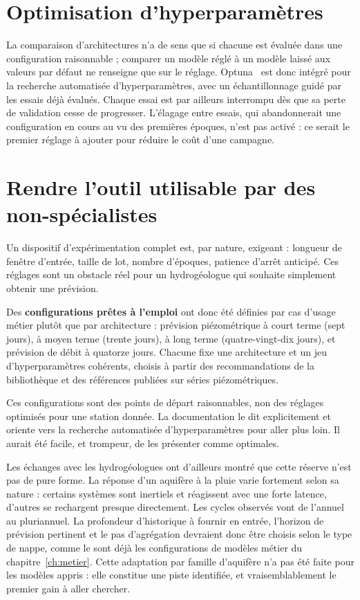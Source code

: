 \section{Optimisation d'hyperparamètres}

La comparaison d'architectures n'a de sens que si chacune est évaluée dans une configuration
raisonnable ; comparer un modèle réglé à un modèle laissé aux valeurs par défaut ne renseigne
que sur le réglage. Optuna~\cite{optuna} est donc intégré pour la recherche automatisée d'hyperparamètres, avec un
échantillonnage guidé par les essais déjà évalués. Chaque essai est par ailleurs interrompu dès
que sa perte de validation cesse de progresser. L'élagage entre essais, qui abandonnerait une
configuration en cours au vu des premières époques, n'est pas activé : ce serait le premier
réglage à ajouter pour réduire le coût d'une campagne.

\section{Rendre l'outil utilisable par des non-spécialistes}

Un dispositif d'expérimentation complet est, par nature, exigeant : longueur de fenêtre
d'entrée, taille de lot, nombre d'époques, patience d'arrêt anticipé. Ces réglages sont un
obstacle réel pour un hydrogéologue qui souhaite simplement obtenir une prévision.

Des \textbf{configurations prêtes à l'emploi} ont donc été définies par cas d'usage métier
plutôt que par architecture : prévision piézométrique à court terme (sept jours), à moyen terme
(trente jours), à long terme (quatre-vingt-dix jours), et prévision de débit à quatorze jours.
Chacune fixe une architecture et un jeu d'hyperparamètres cohérents, choisis à partir des
recommandations de la bibliothèque et des références publiées sur séries piézométriques.

Ces configurations sont des points de départ raisonnables, non des réglages optimisés pour une
station donnée. La documentation le dit explicitement et oriente vers la recherche automatisée
d'hyperparamètres pour aller plus loin. Il aurait été facile, et trompeur, de les présenter
comme optimales.

Les échanges avec les hydrogéologues ont d'ailleurs montré que cette réserve n'est pas de pure
forme. La réponse d'un aquifère à la pluie varie fortement selon sa nature : certains systèmes
sont inertiels et réagissent avec une forte latence, d'autres se rechargent presque
directement. Les cycles observés vont de l'annuel au pluriannuel. La profondeur d'historique à
fournir en entrée, l'horizon de prévision pertinent et le pas d'agrégation devraient donc être
choisis selon le type de nappe, comme le sont déjà les configurations de modèles métier du
chapitre~\ref{ch:metier}. Cette adaptation par famille d'aquifère n'a pas été faite pour les
modèles appris : elle constitue une piste identifiée, et vraisemblablement le premier gain à
aller chercher.

